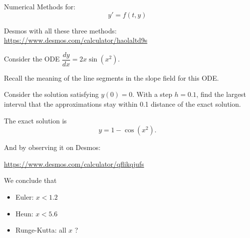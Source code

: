 

\begin{slide}

\question

Numerical Methods for:
\[ y' = f(t,y) \]



\end{slide}


\begin{slide}




Desmos with all these three methods:
\hfil 
\url{https://www.desmos.com/calculator/haolaltd9s}


Consider the ODE $\dfrac{dy}{dx} = 2x\sin(x^2)$.
\begin{parts}
	\item Recall the meaning of the line segments in the slope field for this ODE.

	\item Consider the solution satisfying $y(0)=0$. With a step $h=0.1$, find the largest interval that the approximations stay within 0.1 distance of the exact solution.

\end{parts}

	
\end{slide}




\begin{solution}
\begin{slide}

The exact solution is 
\[
y = 1 - \cos(x^2).
\]

And by observing it on Desmos: 
\begin{center}
	\url{https://www.desmos.com/calculator/qflikqjufs}
\end{center}

We conclude that
\begin{itemize}
	\item Euler: $x< 1.2$
	\item Heun: $x < 5.6$
	\item Runge-Kutta: all $x$ ?
\end{itemize}
	
\end{slide}
	
\end{solution}



